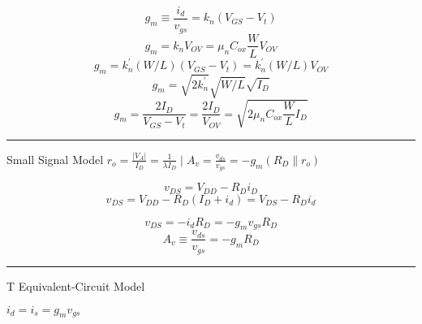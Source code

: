 \documentclass[a4paper]{article}
\begin{document}
\begin{multicols}{3}
$$g_m \equiv \frac{i_d}{v_{gs}} = k_n(V_{GS}-V_t)$$
$$g_m = k_n V_{OV}=\mu_n C_{ox} \frac{W}{L} V_{OV}$$
$$g_m = k_n^{'}(W/L)(V_{GS}-V_t)=k_n^{'}(W/L)V_{OV}$$
$$g_m = \sqrt{2k_n^{'}}\sqrt{W/L}\sqrt{I_D}$$
$$g_m = \frac{2I_D}{V_{GS}-V_t}=\frac{2I_D}{V_{OV}}=\sqrt{2\mu_n C_{ox} \frac{W}{L} I_D}$$

\hrule
\vspace{1mm}
Small Signal Model
$r_o=\frac{|V_A|}{I_D}=\frac{1}{\lambda I_D} \mid A_v=\frac{v_{ds}}{v_{gs}}=-g_m(R_D\parallel r_o)$

$$v_{DS} = V_{DD} - R_D i_D$$
$$v_{DS} = V_{DD} - R_D(I_D + i_d) = V_{DS} - R_D i_d$$

$$v_{DS} = -i_d R_D = -g_m v_{gs} R_D$$
$$A_v \equiv \frac{v_{ds}}{v_{gs}} = -g_m R_D$$

\hrule
\vspace{1mm}
T Equivalent-Circuit Model

$i_d=i_s=g_m v_{gs}$
\end{multicols}
\pagebreak
\end{document}
